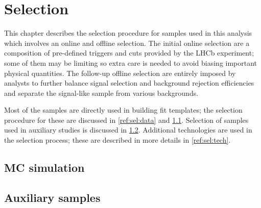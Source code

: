 \chapter{Selection}
\label{ref:sel}

This chapter describes the selection procedure for samples used in this
analysis which involves an online and offline selection.
The initial online selection are a composition of
pre-defined triggers and cuts provided by the LHCb experiment;
some of them may be limiting so extra care is needed to avoid biasing important
physical quantities.
The follow-up offline selection are entirely imposed by analysts
to further balance signal selection and background rejection efficiencies
and separate the signal-like sample from various backgrounds.

Most of the samples are directly used in building fit templates;
the selection procedure for these are discussed in \cref{ref:sel:data} and
\cref{ref:sel:mc}.
Selection of samples used in auxiliary studies is discussed in
\cref{ref:sel:aux-study}.
Additional technologies are used in the selection process;
these are described in more details in
\cref{ref:sel:tech}.





\section{MC simulation}
\label{ref:sel:mc}


\section{Auxiliary samples}
\label{ref:sel:aux-study}



